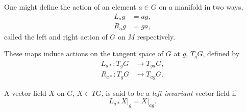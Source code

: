 One might define the action of an element $a \in G$ on a manifold in two ways,
\begin{equation}
  \begin{split}
    L_a g &= a g, \\
    R_a g &= g a,
  \end{split}
\end{equation}
called the left and right action of $G$ on $M$ respectively.

These maps induce actions on the tangent space of $G$ at $g$, $T_g G$, defined by
\begin{equation}
  \begin{split}
    L_{a*} : T_g G &\to T_{ga} G, \\
    R_{a*} : T_g G &\to T_{ag} G.
  \end{split}
\end{equation}

\begin{Def}
  A vector field $X$ on $G$, $X \in TG$, is said to be a \emph{left invariant} vector field if
  \begin{equation}
    L_{a*} X \bigr|_{g} = X \bigr|_{ag}.
  \end{equation}
\end{Def}
